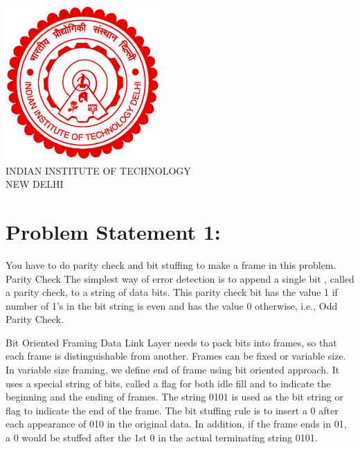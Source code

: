 \documentclass[12pt]{article}
\begin{document}
\begin{titlepage}

\includegraphics[scale=.5]{logo.png}\\[1cm] %
\LARGE{INDIAN INSTITUTE OF TECHNOLOGY}\\
{\Large{NEW DELHI}}\\
\HRule

\vfill %

\end{titlepage}

\newpage %

\tableofcontents

\newpage

\section{Problem Statement 1: }
You have to do parity check and bit stuffing to make a frame in this problem.
Parity Check
The simplest way of error detection is to append a single bit , called a parity check, to a string of data bits. This parity check bit has the value 1 if number of 1’s in the bit string is even and has the value 0 otherwise, i.e., Odd Parity Check.

Bit Oriented Framing
Data Link Layer needs to pack bits into frames, so that each frame is distinguishable from another. Frames can be fixed or variable size. In variable size framing, we define end of frame using bit oriented approach. It uses a special string of bits, called a flag for both idle fill and to indicate the beginning and the ending of frames.
The string 0101 is used as the bit string or flag to indicate the end of the frame. The bit stuffing rule is to insert a 0 after each appearance of 010 in the original data. In addition, if the frame ends in 01, a 0 would be stuffed after the 1st 0 in the actual terminating string 0101.
\end{document}
